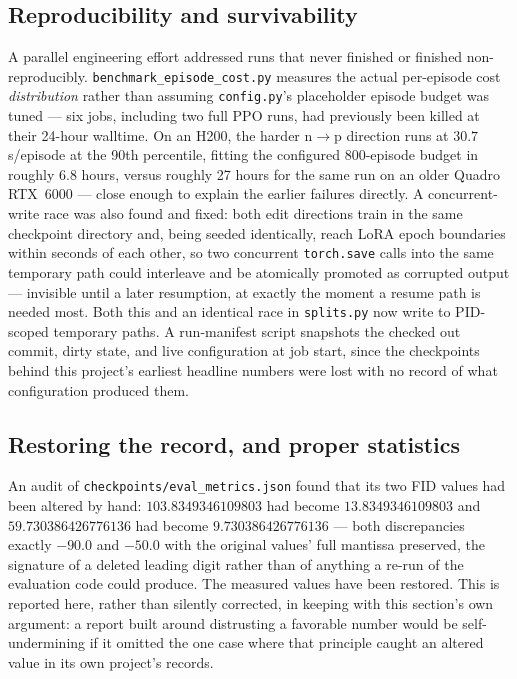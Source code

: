 \documentclass[11pt]{article}
\begin{document}
\subsection{Reproducibility and survivability}

A parallel engineering effort addressed runs that never finished or
finished non-reproducibly. \texttt{benchmark\_episode\_}\allowbreak\texttt{cost.py} measures
the actual per-episode cost \emph{distribution} rather than assuming
\texttt{config.py}'s placeholder episode budget was tuned — six jobs,
including two full PPO runs, had previously been killed at their 24-hour
walltime. On an H200, the harder n$\to$p direction runs at $30.7$s/episode
at the 90th percentile, fitting the configured 800-episode budget in
roughly 6.8 hours, versus roughly 27 hours for the same run on an older
Quadro RTX~6000 — close enough to explain the earlier failures directly.
A concurrent-write race was also found and fixed: both edit directions
train in the same checkpoint directory and, being seeded identically,
reach LoRA epoch boundaries within seconds of each other, so two
concurrent \texttt{torch.save} calls into the same temporary path could
interleave and be atomically promoted as corrupted output — invisible
until a later resumption, at exactly the moment a resume path is needed
most. Both this and an identical race in \texttt{splits.py} now write to
PID-scoped temporary paths. A run-manifest script snapshots the checked
out commit, dirty state, and live configuration at job start, since the
checkpoints behind this project's earliest headline numbers were lost with
no record of what configuration produced them.

\subsection{Restoring the record, and proper statistics}

An audit of \texttt{checkpoints/eval\_metrics.json} found that its two FID
values had been altered by hand: $103.8349346109803$ had become
$13.8349346109803$ and $59.730386426776136$ had become $9.730386426776136$
— both discrepancies exactly $-90.0$ and $-50.0$ with the original values'
full mantissa preserved, the signature of a deleted leading digit rather
than of anything a re-run of the evaluation code could produce. The
measured values have been restored. This is reported here, rather than
silently corrected, in keeping with this section's own argument: a report
built around distrusting a favorable number would be self-undermining if
it omitted the one case where that principle caught an altered value in
its own project's records.
\end{document}
